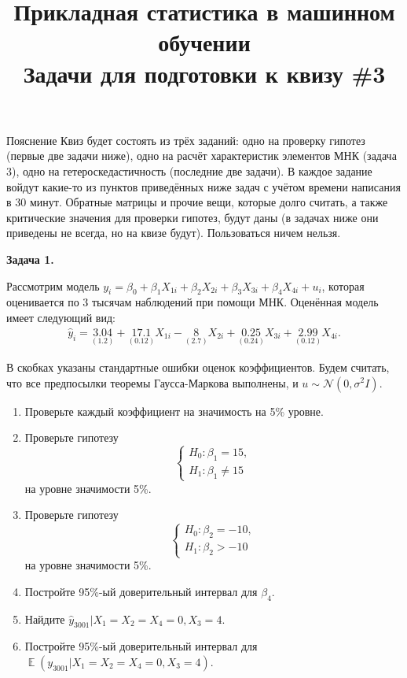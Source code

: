 \documentclass[10pt, a4paper]{extarticle}
\title{{\normalsize Прикладная статистика в машинном обучении} \\ \vspace{0.5em} Задачи для подготовки к квизу \#3}
\author{\rule{15cm}{0.4pt}}
\DeclareMathOperator{\E}{\mathbb{E}}
\begin{document}
	
	\maketitle
	
	\begin{rulesbox}{Пояснение}
		Квиз будет состоять из трёх заданий: одно на проверку гипотез (первые две задачи ниже), одно на расчёт характеристик элементов МНК (задача 3), одно на гетероскедастичность (последние две задачи). В каждое задание войдут какие-то из пунктов приведённых ниже задач с учётом времени написания в 30 минут. Обратные матрицы и прочие вещи, которые долго считать, а также критические значения для проверки гипотез, будут даны (в задачах ниже они приведены не всегда, но на квизе будут). Пользоваться ничем нельзя. 
	\end{rulesbox}
	\vspace{1em}

	{\Large \textbf{Задача 1.}}
	
	Рассмотрим модель $y_i = \beta_0 + \beta_1X_{1i} + \beta_2X_{2i} + \beta_3X_{3i} + \beta_4X_{4i} + u_i$, которая оценивается по 3 тысячам наблюдений при помощи МНК. Оценённая модель имеет следующий вид:
	\begin{align*}
		\hat{y}_i = \underset{(1.2)}{3.04} + \underset{(0.12)}{17.1}X_{1i} - \underset{(2.7)}{8}X_{2i} + \underset{(0.24)}{0.25}X_{3i} + \underset{(0.12)}{2.99}X_{4i}.
	\end{align*}
	
	В скобках указаны стандартные ошибки оценок коэффициентов. Будем считать, что все предпосылки теоремы Гаусса-Маркова выполнены, и $u \sim \mathcal{N}(0, \sigma^2I)$.
	
	\begin{enumerate}[label=\alph*)]
		\item Проверьте каждый коэффициент на значимость на 5\% уровне.
		\item Проверьте гипотезу
		\[
		\begin{cases}
			H_0: \beta_1 = 15, \\
			H_1: \beta_1 \ne 15
		\end{cases}
		\]
		на уровне значимости 5\%.
		\item Проверьте гипотезу
		\[
		\begin{cases}
			H_0: \beta_2 = -10, \\
			H_1: \beta_2 > -10
		\end{cases}
		\]
		на уровне значимости 5\%.
		\item Постройте 95\%-ый доверительный интервал для $\beta_4$. 
		\item Найдите $\hat{y}_{3001} | X_1 = X_2 = X_4 = 0, X_3 = 4$. 
		\item Постройте 95\%-ый доверительный интервал для $\E(y_{3001} | X_1 = X_2 = X_4 = 0, X_3 = 4)$.
	\end{enumerate}
	\vspace{1em}
	\newpage
\end{document}
